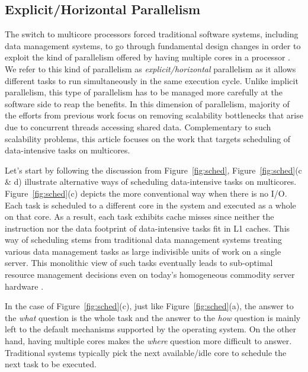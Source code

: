 \documentclass[11pt,dvipdfm]{article}
\newcommand{\reffig}[1]{Figure~\ref{fig:#1}}
\begin{document}
\subsection{Explicit/Horizontal Parallelism}
\label{sec:sched:expl}

The switch to multicore processors forced traditional software systems,
including data management systems,
to go through fundamental design changes in order to exploit
the kind of parallelism offered by having multiple cores in a processor \cite{AilamakiLTPP17}.
We refer to this kind of parallelism as \textit{explicit/horizontal} parallelism
as it allows different tasks to run simultaneously in the same execution cycle.
Unlike implicit parallelism,
this type of parallelism has to be managed more carefully at the software side to reap the benefits.
In this dimension of parallelism,
majority of the efforts from previous work focus on removing scalability bottlenecks that arise
due to concurrent threads accessing shared data.
Complementary to such scalability problems,
this article focuses on the work that targets scheduling of data-intensive tasks on multicores.

Let's start by following the discussion from \reffig{sched},
\reffig{sched}(c \& d) illustrate alternative ways of scheduling data-intensive tasks on multicores.
\reffig{sched}(c) depicts the more conventional way when there is no I/O.
Each task is scheduled to a different core in the system and executed as a whole on that core.
As a result, each task exhibits cache misses
since neither the instruction nor the data footprint of data-intensive tasks fit in L1 caches.
This way of scheduling stems from traditional data management systems treating various
data management tasks as large indivisible units of work on a single server.
This monolithic view of such tasks eventually leads to sub-optimal resource management
decisions even on today's homogeneous commodity server hardware \cite{TozunAAM14}.

In the case of \reffig{sched}(c), just like \reffig{sched}(a),
the answer to the \textit{what} question is the whole task
and the answer to the \textit{how} question is mainly left to the default mechanisms supported by the operating system.
On the other hand,
having multiple cores makes the \textit{where} question more difficult to answer.
Traditional systems typically pick the next available/idle core to schedule the next task to be executed.
\end{document}
